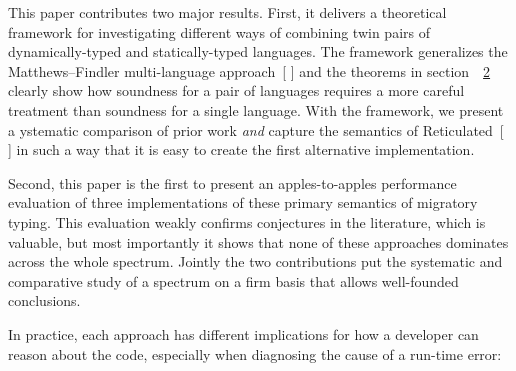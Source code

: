 \documentclass[screen=true, 10pt, acmsmall]{acmart}
\makeatletter
\newcommand{\ChapRef}[2]{\SecRef{#1}{#2}}
\newcommand{\SecRef}[2]{section~#1}
\newcommand{\SectionNumberLink}[2]{\hyperref[#1]{#2}}
\newcommand{\Sendabbrev}[1]{#1\@}
\newcommand{\AutobibLink}[1]{\color{ACMPurple}{#1}}
\newcommand{\Autobibref}[1]{#1}
\providecommand{\AutobibLink}[1]{#1}
\renewcommand{\SecRef}[2]{~#1}
\newcommand{\folong}{first-order}
\makeatother
\begin{document}
This paper contributes two major results. First, it delivers a
 theoretical framework for investigating different ways of combining twin
 pairs of dynamically{-}typed and statically{-}typed languages. The framework
 generalizes the Matthews{--}Findler multi{-}language
 approach\Autobibref{~[\hyperref[t:x28autobib_x22Jacob_Matthews_and_Robert_Bruce_FindlerOperational_Semantics_for_Multix2dlanguage_ProgramsTransactions_on_Programming_Languages_and_Systems_31x283x29x2c_ppx2e_1x2dx2d442009x22x29]{\AutobibLink{Matthews and Findler}} \hyperref[t:x28autobib_x22Jacob_Matthews_and_Robert_Bruce_FindlerOperational_Semantics_for_Multix2dlanguage_ProgramsTransactions_on_Programming_Languages_and_Systems_31x283x29x2c_ppx2e_1x2dx2d442009x22x29]{\AutobibLink{2009}}]} and the theorems in section~\ChapRef{\SectionNumberLink{t:x28part_x22secx3adesignx22x29}{2}}{Syntax, Types, and Semantics}
 clearly show how soundness for a pair of languages requires a more careful
 treatment than soundness for a single language.
With the framework, we present a
 ystematic comparison of prior work
 \textit{and} capture the \relax{\folong} semantics of Reticulated\Autobibref{~[\hyperref[t:x28autobib_x22Michael_Mx2e_Vitousekx2c_Cameron_Swordsx2c_and_Jeremy_Gx2e_SiekBig_Types_in_Little_Runtimex3a_Openx2dWorld_Soundness_and_Collaborative_Blame_for_Gradual_Type_SystemsSymposium_on_Principles_of_Programming_Languagesx2c_ppx2e_762x2dx2d7742017x22x29]{\AutobibLink{Vitousek et al\Sendabbrev{.}}} \hyperref[t:x28autobib_x22Michael_Mx2e_Vitousekx2c_Cameron_Swordsx2c_and_Jeremy_Gx2e_SiekBig_Types_in_Little_Runtimex3a_Openx2dWorld_Soundness_and_Collaborative_Blame_for_Gradual_Type_SystemsSymposium_on_Principles_of_Programming_Languagesx2c_ppx2e_762x2dx2d7742017x22x29]{\AutobibLink{2017}}]}
 in such a way that it
 is easy to create the first alternative implementation.

Second, this paper is the first to present an apples{-}to{-}apples performance
 evaluation of three implementations of these primary semantics of
 migratory typing. This evaluation weakly confirms conjectures in the
 literature, which is valuable, but most importantly it shows that none of
 these approaches dominates across the whole spectrum. Jointly the two
 contributions put the systematic and comparative study of a spectrum on
 a firm basis that allows well{-}founded conclusions.

In practice, each approach has different implications for how a developer can
reason about the code, especially when diagnosing the cause of a run{-}time error:
\end{document}
